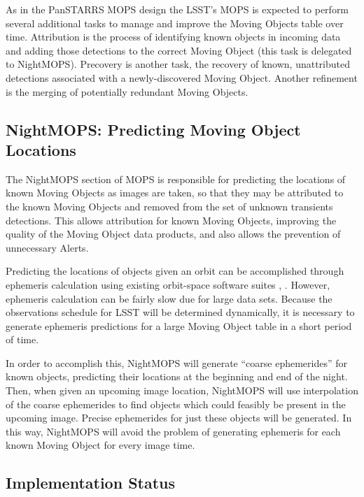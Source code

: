 \documentclass[12pt,preprint]{aastex}
\begin{document}
As in the PanSTARRS MOPS design \citep{psMOPSDesign} the LSST's MOPS
is expected to perform several additional tasks to manage and improve
the Moving Objects table over time.  Attribution is the process of
identifying known objects in incoming data and adding those detections
to the correct Moving Object (this task is delegated to
NightMOPS). Precovery is another task, the recovery of known,
unattributed detections associated with a newly-discovered Moving
Object.  Another refinement is the merging of potentially redundant
Moving Objects.


\subsection{NightMOPS: Predicting Moving Object Locations}

The NightMOPS section of MOPS is responsible for predicting the
locations of known Moving Objects as images are taken, so that they
may be attributed to the known Moving Objects and removed from the set
of unknown transients detections.  This allows attribution for known
Moving Objects, improving the quality of the Moving Object data
products, and also allows the prevention of unnecessary Alerts.

Predicting the locations of objects given an orbit can be accomplished
through ephemeris calculation using existing orbit-space software
suites \citep{Milani2006}, \citep{OpenOrb2009}.  However, ephemeris
calculation can be fairly slow due for large data sets.  Because the
observations schedule for LSST will be determined dynamically, it is
necessary to generate ephemeris predictions for a large Moving Object
table in a short period of time.


In order to accomplish this, NightMOPS will generate ``coarse
ephemerides'' for known objects, predicting their locations at the
beginning and end of the night.  Then, when given an upcoming image
location, NightMOPS will use interpolation of the coarse ephemerides
to find objects which could feasibly be present in the upcoming
image. Precise ephemerides for just these objects will be
generated. In this way, NightMOPS will avoid the problem of generating
ephemeris for each known Moving Object for every image time.


\subsection{Implementation Status}
\end{document}
